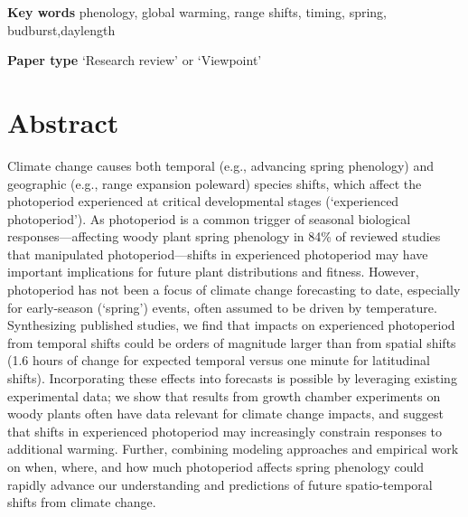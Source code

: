 \documentclass{article}
\begin{document}
\textbf{Key words} phenology, global warming, range shifts, timing, spring, budburst,daylength 

\textbf{Paper type} `Research review' or `Viewpoint'








\newpage
\linenumbers
\section*{Abstract}
Climate change causes both temporal (e.g., advancing spring phenology) and geographic (e.g., range expansion poleward) species shifts, which affect the photoperiod experienced at critical developmental stages (`experienced photoperiod'). As photoperiod is a common trigger of seasonal biological responses---affecting woody plant spring phenology in 84\% of reviewed studies that manipulated photoperiod---shifts in experienced photoperiod may have important implications for future plant distributions and fitness. However, photoperiod has not been a focus of climate change forecasting to date, especially for early-season (`spring') events, often assumed to be driven by temperature. Synthesizing published studies, we find that impacts on experienced photoperiod from temporal shifts could be orders of magnitude larger than from spatial shifts (1.6 hours of change for expected temporal versus one minute for latitudinal shifts). Incorporating these effects into forecasts is possible by leveraging existing experimental data; we show that results from growth chamber experiments on woody plants often have data relevant for climate change impacts, and suggest that shifts in experienced photoperiod may increasingly constrain responses to additional warming. Further, combining modeling approaches and empirical work on when, where, and how much photoperiod affects spring phenology could rapidly advance our understanding and predictions of future spatio-temporal shifts from climate change. 
\end{document}
